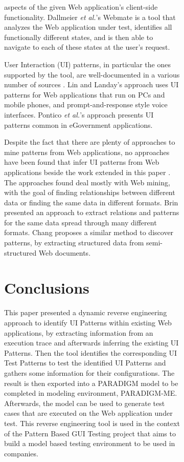 \documentclass[conference]{IEEEtran}
\begin{document}
\begin{enumerate}
\begin{figure}[!htb]
\begin{itemize}
\begin{figure}[!htb]
\begin{itemize}
aspects of the given Web application's client-side functionality.  Dallmeier \textit{et al.}'s Webmate \cite{dallmeier2012Webmate,dallmeier2013Webmate} is a tool that analyzes the Web application under test, identifies all functionally different states, and is then able to navigate to each of these states at the user’s request.

User Interaction (UI) patterns, in particular the ones supported by the tool, are well-documented in a various number of sources \cite{tidwell2010designing, van2001patterns, neil12standard,sinnig2005patterns}. Lin and Landay's approach \cite{lin2008employing} uses UI patterns for Web applications that run on PCs and mobile phones, and prompt-and-response style voice interfaces. Pontico \textit{et al.}'s approach \cite{pontico2008organizing} presents UI patterns common in eGovernment applications.

Despite the fact that there are plenty of approaches to mine patterns from Web applications, no approaches have been found that infer UI patterns from Web applications beside the work extended in this paper \cite{nabuco2013inferring, morgado2012gui}. The approaches found deal mostly with Web mining, with the goal of finding relationships between different data or finding the same data in different formats. Brin \cite{brin1999extracting} presented an approach to extract relations and patterns for the same data spread through many different formats. Chang \cite{chang2003automatic} proposes a similar method to discover patterns, by extracting structured data from semi-structured Web documents.

\section{Conclusions}\label{sec:conc}

This paper presented a dynamic reverse engineering approach to identify UI Patterns within existing Web applications, by extracting information from an execution trace and afterwards inferring the existing UI Patterns. Then the tool identifies the corresponding UI Test Patterns to test the identified UI Patterns and gathers some information for their configurations. The result is then exported into a PARADIGM model to be completed in modeling environment, PARADIGM-ME. Afterwards, the model can be used to generate test cases that are executed on the Web application under test. This reverse engineering tool is used in the context of the Pattern Based GUI Testing project that aims to build a model based testing environment to be used in companies. 


\end{itemize}
\end{figure}
\end{itemize}
\end{figure}
\end{enumerate}
\end{document}
